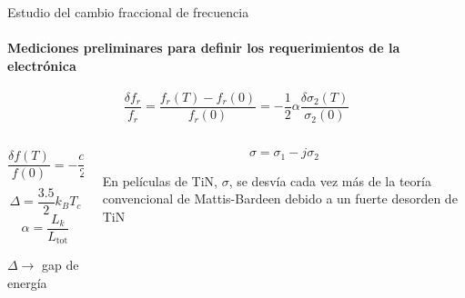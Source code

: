 \documentclass[ignorenonframetext,12pt]{beamer}
\begin{document}
%
\begin{frame}{Estudio del cambio fraccional de frecuencia}
				\framesubtitle{Mediciones preliminares para definir los requerimientos
				de la electrónica}
												\begin{equation*}
																\frac{\delta f_r}{f_r} = \frac{f_r(T) -
																f_r(0)}{f_r(0)} = -\frac{1}{2}\alpha\frac{\delta
																\sigma_2(T)}{\sigma_2(0)}
												\end{equation*}
				\begin{columns}
								\begin{column}{0.49\textwidth}
												{\color{blue}\begin{equation*}
								\frac{\delta f(T)}{f(0)} = 
																-\frac{\alpha}{2}\sqrt{\frac{\pi \Delta}{2 k_B
																T}} e^{-\frac{\Delta}{k_B T}}
												\end{equation*}}
				\begin{equation*}
								\Delta = \frac{3.5}{2} k_B T_c
				\end{equation*}
				\begin{equation*}
								\alpha = \frac{L_k}{L_\text{tot}}
				\end{equation*}

												$\Delta \to$ gap de energía
								\end{column}
				\begin{column}{0.49\textwidth}
				\begin{equation*}
								\sigma = \sigma_1 - j \sigma_2
				\end{equation*}

								En películas de TiN, $\sigma$, se desvía cada vez más de la
								teoría convencional	de Mattis-Bardeen debido a un \alert{fuerte
								desorden de TiN}
								\end{column}
								\end{columns}
\end{frame}
\end{document}
